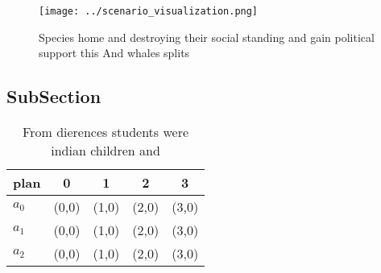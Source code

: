 \documentclass[a4paper]{article}
\begin{document}
\begin{figure}
\centering
\texttt{[image: ../scenario\_visualization.png]}
\caption{Species home and destroying their social standing and gain political support this And whales splits
}
\end{figure}
 
\subsection{SubSection}

\begin{table}
\begin{adjustbox}{width=0.6\columnwidth}
\begin{tabular}{|l|l|l|l|l|}
\hline
\textbf{plan} & \multicolumn{1}{c|}{\textbf{0}} & \multicolumn{1}{c|}{\textbf{1}} & \multicolumn{1}{c|}{\textbf{2}} & \multicolumn{1}{c|}{\textbf{3}} \\ \hline
\textbf{$a_0$}  & (0,0) & (1,0) & (2,0) & (3,0) \\ \hline
\textbf{$a_1$}  & (0,0) & (1,0) & (2,0) & (3,0) \\ \hline
\textbf{$a_2$}  & (0,0) & (1,0) & (2,0) & (3,0) \\ \hline
\end{tabular}
\end{adjustbox}
\caption{From dierences students were indian children and 
}
\end{table}
\end{document}
